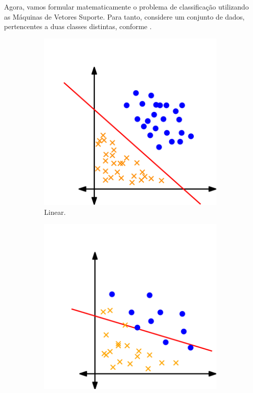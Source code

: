 \documentclass[12pt,a4paper]{scrartcl}
\theoremstyle{definition}%
\begin{document}
Agora, vamos formular matematicamente o problema de classificação utilizando as Máquinas de Vetores Suporte. Para tanto, considere um conjunto de dados, pertencentes a duas classes distintas, conforme .


\begin{figure}[!ht] 
\centering
\begin{subfigure}[h]{0.3\textwidth}
\centering
\includegraphics[width=\textwidth]{hiperplano_SVM_linear}
\caption{Linear. \label{fig:classificacao_dados:hiperplano_SVM_linear}}
\end{subfigure}
\begin{subfigure}[!ht]{0.3\textwidth}
	\centering
	\includegraphics[width=\textwidth]{hiperplano_SVM_flexivel}

\end{subfigure}
\end{figure}
\end{document}
